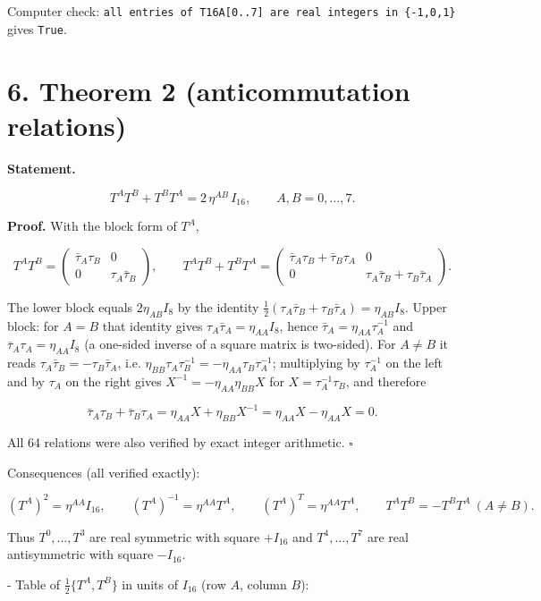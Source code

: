 \documentclass[10pt]{article}
\makeatletter
\newcommand\keepnext{\par\nopagebreak\@nobreaktrue\everypar{\@nobreakfalse\everypar{}}}
\newcommand\mdneed[1]{\par\if@nobreak\else\begingroup\setlength{\dimen@}{#1}\dimen@ii\pagegoal\advance\dimen@ii-\pagetotal
  \ifdim\dimen@>\dimen@ii\ifdim\dimen@ii>\z@\vfil\fi\break\fi\endgroup\fi}
\makeatother
\begin{document}
Computer check: \texttt{all entries of T16A[0..7] are real integers in \{-1,0,1\}} gives \texttt{True}.


\section*{6. Theorem 2 (anticommutation relations)}

\textbf{Statement.}\keepnext


\[
T^A T^B + T^B T^A = 2\,\eta^{AB}\, I_{16}, \qquad A,B = 0,\dots,7 .
\]

\textbf{Proof.} With the block form of $T^A$,\keepnext


\[
T^A T^B = \begin{pmatrix} \bar\tau_A\tau_B & 0 \\ 0 & \tau_A\bar\tau_B \end{pmatrix}, \qquad T^A T^B + T^B T^A = \begin{pmatrix} \bar\tau_A\tau_B + \bar\tau_B\tau_A & 0 \\ 0 & \tau_A\bar\tau_B + \tau_B\bar\tau_A \end{pmatrix}.
\]

The lower block equals $2\eta_{AB} I_8$ by the identity $\tfrac12(\tau_A\bar\tau_B + \tau_B\bar\tau_A) = \eta_{AB} I_8$. Upper block: for $A=B$ that identity gives $\tau_A\bar\tau_A = \eta_{AA} I_8$, hence $\bar\tau_A = \eta_{AA}\tau_A^{-1}$ and $\bar\tau_A\tau_A = \eta_{AA} I_8$ (a one-sided inverse of a square matrix is two-sided). For $A\neq B$ it reads $\tau_A\bar\tau_B = -\tau_B\bar\tau_A$, i.e. $\eta_{BB}\tau_A\tau_B^{-1} = -\eta_{AA}\tau_B\tau_A^{-1}$; multiplying by $\tau_A^{-1}$ on the left and by $\tau_A$ on the right gives $X^{-1} = -\eta_{AA}\eta_{BB}X$ for $X = \tau_A^{-1}\tau_B$, and therefore\keepnext


\[
\bar\tau_A\tau_B + \bar\tau_B\tau_A = \eta_{AA}X + \eta_{BB}X^{-1} = \eta_{AA}X - \eta_{AA}X = 0 .
\]

All 64 relations were also verified by exact integer arithmetic. $\square$


Consequences (all verified exactly):\keepnext


\[
(T^A)^2 = \eta^{AA} I_{16}, \qquad (T^A)^{-1} = \eta^{AA} T^A, \qquad (T^A)^T = \eta^{AA} T^A, \qquad T^A T^B = -T^B T^A\ (A \neq B).
\]

Thus $T^0,\dots,T^3$ are real symmetric with square $+I_{16}$ and $T^4,\dots,T^7$ are real antisymmetric with square $-I_{16}$.


\mdneed{12.5\baselineskip}Table of $\tfrac12\{T^A,T^B\}$ in units of $I_{16}$ (row $A$, column $B$):\keepnext
\end{document}
